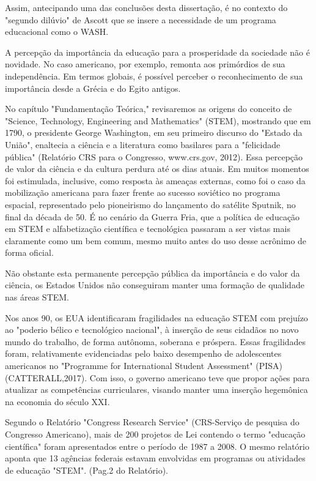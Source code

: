 Assim, antecipando  uma das conclusões desta dissertação, é no contexto do "segundo dilúvio" de Ascott que se insere a necessidade de um programa educacional como o WASH.

A percepção da importância da educação para a prosperidade da sociedade não é novidade. No caso americano, por exemplo, remonta aos primórdios de sua independência. Em termos globais, é possível perceber o reconhecimento de sua importância desde a Grécia e do Egito antigos.

No capítulo "Fundamentação Teórica," revisaremos as origens do conceito de "Science, Technology, Engineering and Mathematics" (STEM), mostrando que em 1790, o presidente George Washington, em seu primeiro discurso do "Estado da União", enaltecia a ciência e a literatura como  basilares para a "felicidade pública" (Relatório CRS para o Congresso, www.crs.gov, 2012). Essa percepção de valor da ciência e da cultura perdura até os dias atuais. Em muitos momentos foi estimulada, inclusive, como resposta às ameaças externas, como foi o caso da mobilização americana para fazer frente ao sucesso soviético no programa espacial, representado pelo pioneirismo do lançamento do satélite Sputnik, no final da década de 50. É no cenário da Guerra Fria, que a política de educação em STEM e alfabetização científica e tecnológica passaram a ser vistas mais claramente como um bem comum, mesmo muito antes do uso desse acrônimo de forma oficial.

Não obstante esta permanente percepção pública da importância e do valor da ciência, os Estados Unidos não conseguiram manter uma formação de qualidade nas áreas STEM.

Nos anos 90, os EUA identificaram fragilidades na educação STEM com prejuízo ao "poderio bélico e tecnológico nacional", à inserção de seus cidadãos no novo mundo do trabalho, de forma autônoma, soberana  e próspera. Essas fragilidades foram, relativamente evidenciadas pelo baixo desempenho de adolescentes americanos no "Programme for International Student Assessment" (PISA)  (CATTERALL,2017). Com isso, o governo americano teve que propor ações para atualizar as competências curriculares, visando manter uma inserção hegemônica na economia do século XXI.

Segundo o Relatório "Congress Research Service" (CRS-Serviço de pesquisa do Congresso Americano), mais de 200 projetos de Lei contendo o termo "educação científica" foram apresentados entre o período de 1987 a 2008. O mesmo relatório aponta que 13 agências federais estavam envolvidas em programas ou atividades de educação "STEM". (Pag.2 do Relatório).

